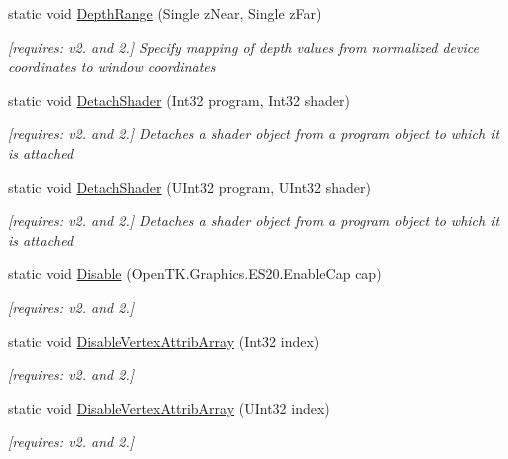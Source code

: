 \begin{DoxyCompactItemize}
static void \hyperlink{class_open_t_k_1_1_graphics_1_1_e_s20_1_1_g_l_aa3ea5a51e415d2d479de27ebace8f754}{Depth\-Range} (Single z\-Near, Single z\-Far)
\begin{DoxyCompactList}\small\item\em \mbox{[}requires\-: v2. and 2.\mbox{]} Specify mapping of depth values from normalized device coordinates to window coordinates \end{DoxyCompactList}\item 
static void \hyperlink{class_open_t_k_1_1_graphics_1_1_e_s20_1_1_g_l_aada623eba363a19733b57cab36a6587e}{Detach\-Shader} (Int32 program, Int32 shader)
\begin{DoxyCompactList}\small\item\em \mbox{[}requires\-: v2. and 2.\mbox{]} Detaches a shader object from a program object to which it is attached \end{DoxyCompactList}\item 
static void \hyperlink{class_open_t_k_1_1_graphics_1_1_e_s20_1_1_g_l_aff12cdc9b19f6ee4edf24d846b760dda}{Detach\-Shader} (U\-Int32 program, U\-Int32 shader)
\begin{DoxyCompactList}\small\item\em \mbox{[}requires\-: v2. and 2.\mbox{]} Detaches a shader object from a program object to which it is attached \end{DoxyCompactList}\item 
static void \hyperlink{class_open_t_k_1_1_graphics_1_1_e_s20_1_1_g_l_a9ee11366b929653d56141ff9b916019e}{Disable} (Open\-T\-K.\-Graphics.\-E\-S20.\-Enable\-Cap cap)
\begin{DoxyCompactList}\small\item\em \mbox{[}requires\-: v2. and 2.\mbox{]}\end{DoxyCompactList}\item 
static void \hyperlink{class_open_t_k_1_1_graphics_1_1_e_s20_1_1_g_l_a8a52268480506d44eaac7d33b1a5c805}{Disable\-Vertex\-Attrib\-Array} (Int32 index)
\begin{DoxyCompactList}\small\item\em \mbox{[}requires\-: v2. and 2.\mbox{]}\end{DoxyCompactList}\item 
static void \hyperlink{class_open_t_k_1_1_graphics_1_1_e_s20_1_1_g_l_adfda382fa7d771d551a7bdd9261966c8}{Disable\-Vertex\-Attrib\-Array} (U\-Int32 index)
\begin{DoxyCompactList}\small\item\em \mbox{[}requires\-: v2. and 2.\mbox{]}\end{DoxyCompactList}\item 

\end{DoxyCompactItemize}
